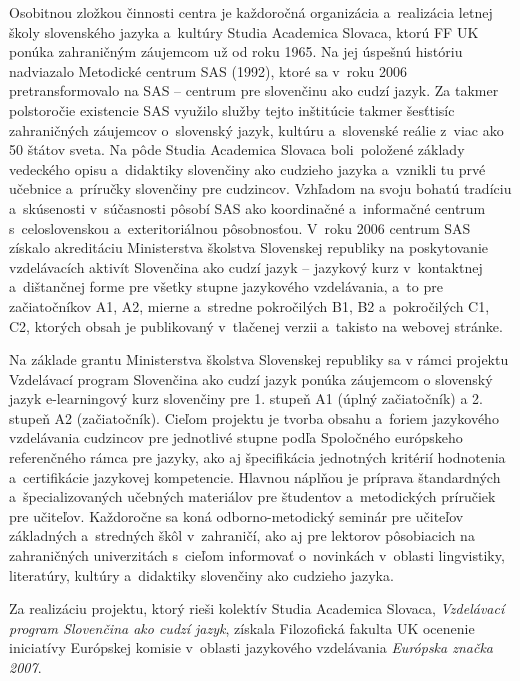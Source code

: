 \begin{multicols}{2}
Osobitnou zložkou činnosti centra je každoročná organizácia a~realizácia letnej školy slovenského jazyka a~kultúry Studia Academica Slovaca, ktorú FF UK ponúka zahraničným záujemcom už od roku 1965. Na jej úspešnú históriu nadviazalo Metodické centrum SAS (1992), ktoré sa v~roku 2006 pretransformovalo na SAS – centrum pre slovenčinu ako cudzí jazyk. Za takmer polstoročie existencie SAS využilo služby tejto inštitúcie takmer šesťtisíc zahraničných záujemcov o~slovenský jazyk, kultúru a~slovenské reálie z~viac ako 50 štátov sveta. Na pôde Studia Academica Slovaca boli~položené základy vedeckého opisu a~didaktiky slovenčiny ako cudzieho jazyka a~vznikli tu prvé učebnice a~príručky slovenčiny pre cudzincov. Vzhľadom na svoju bohatú tradíciu a~skúsenosti v~súčasnosti pôsobí SAS ako koordinačné a~informačné centrum s~celoslovenskou a~exteritoriálnou pôsobnosťou.
V~roku 2006 centrum SAS získalo akreditáciu Ministerstva školstva Slovenskej republiky na poskytovanie vzdelávacích aktivít Slovenčina ako cudzí jazyk – jazykový kurz v~kontaktnej a~dištančnej forme pre všetky stupne jazykového vzdelávania, a~to pre začiatočníkov A1, A2, mierne a~stredne pokročilých B1, B2 a~pokročilých C1, C2, ktorých obsah je publikovaný v~tlačenej verzii \cite{pekarovicova2007} a~takisto na webovej stránke\cite{f9}.

Na základe grantu Ministerstva školstva Slovenskej republiky sa v rámci projektu Vzdelávací program Slovenčina ako cudzí jazyk ponúka záujemcom o slovenský jazyk e-learningový kurz slovenčiny\cite{f33} pre 1. stupeň A1 (úplný začiatočník) a 2. stupeň A2 (začiatočník). Cieľom projektu je tvorba obsahu a~foriem jazykového vzdelávania cudzincov pre jednotlivé stupne podľa Spoločného európskeho referenčného rámca pre jazyky, ako aj špecifikácia jednotných kritérií hodnotenia a~certifikácie jazykovej kompetencie. Hlavnou náplňou je príprava štandardných a~špecializovaných učebných materiálov pre študentov a~metodických príručiek pre učiteľov. Každoročne sa koná odborno-metodický seminár pre učiteľov základných a~stredných škôl v~zahraničí, ako aj pre lektorov pôsobiacich na zahraničných univerzitách s~cieľom informovať o~novinkách v~oblasti lingvistiky, literatúry, kultúry a~didaktiky slovenčiny ako cudzieho jazyka.

Za realizáciu projektu, ktorý rieši kolektív Studia Academica Slovaca, \emph{Vzdelávací program Slovenčina ako cudzí jazyk}, získala Filozofická fakulta UK ocenenie iniciatívy Európskej komisie v~oblasti jazykového vzdelávania \emph{Európska značka 2007}.


\end{multicols}
